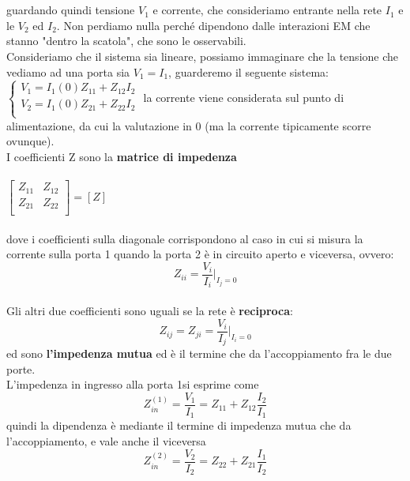 \documentclass[oneside, 12pt]{extbook}
\begin{document}
\\\\guardando quindi tensione $V_1$ e corrente, che consideriamo entrante nella rete $I_1$ e le $V_2$ ed $I_2$. Non perdiamo nulla perché dipendono dalle interazioni EM che stanno "dentro la scatola", che sono le osservabili.\\Consideriamo che il sistema sia lineare, possiamo immaginare che la tensione che vediamo ad una porta sia $V_1 = I_1$, guarderemo il seguente sistema:
$
\begin{cases}
	V_1 = I_1(0) Z_{11} + Z_{12}I_2\\
	V_2 = I_1(0) Z_{21} + Z_{22}I_2\\
\end{cases}
$
la corrente viene considerata sul punto di alimentazione, da cui la valutazione in 0 (ma la corrente tipicamente scorre ovunque).\\I coefficienti Z sono la \textbf{matrice di impedenza}\\\\
$
\begin{bmatrix}
	Z_{11} & Z_{12}\\
	Z_{21} & Z_{22}\\
\end{bmatrix}
= [Z]
$
\\\\dove i coefficienti sulla diagonale corrispondono al caso in cui si misura la corrente sulla porta 1 quando la porta 2 è in circuito aperto e viceversa, ovvero:
\begin{equation}
	Z_{ii} = \frac{V_i}{I_i}\bigg\rvert_{I_j = 0}
\end{equation}
\\Gli altri due coefficienti sono uguali se la rete è \textbf{reciproca}:
\begin{equation}
	Z_{ij} = Z_{ji} = \frac{V_i}{I_j}\bigg\rvert_{I_i = 0}
\end{equation}
ed sono \textbf{l'impedenza mutua} ed è il termine che da l'accoppiamento fra le due porte.\\L'impedenza in ingresso alla porta 1si esprime come 
\begin{equation}
	Z_{in}^{(1)} = \frac{V_1}{I_1} = Z_{11} + Z_{12}\frac{I_2}{I_1}	
\end{equation}
quindi la dipendenza è mediante il termine di impedenza mutua che da l'accoppiamento, e vale anche il viceversa 
\begin{equation}
	Z_{in}^{(2)} = \frac{V_2}{I_2} = Z_{22} + Z_{21}\frac{I_1}{I_2}
\end{equation}
\end{document}
